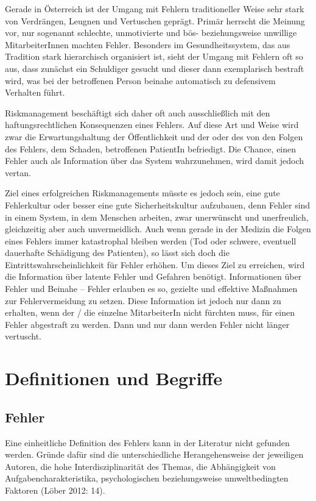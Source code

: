 Gerade in Österreich ist der Umgang mit Fehlern
traditioneller Weise sehr stark von Verdrängen, Leugnen und
Vertuschen geprägt. Primär herrscht die Meinung vor, nur
sogenannt schlechte, unmotivierte und bös- beziehungsweise
unwillige MitarbeiterInnen machten Fehler. Besonders im
Gesundheitssystem, das aus Tradition stark hierarchisch
organisiert ist, sieht der Umgang mit Fehlern oft so aus,
dass zunächst ein Schuldiger gesucht und dieser dann
exemplarisch bestraft wird, was bei der betroffenen Person
beinahe automatisch zu defensivem Verhalten führt.




Riskmanagement beschäftigt sich daher oft auch
ausschließlich mit den haftungsrechtlichen Konsequenzen
eines Fehlers. Auf diese Art und Weise wird zwar die
Erwartungshaltung der Öffentlichkeit und der oder des von
den Folgen des Fehlers, dem Schaden, betroffenen PatientIn
befriedigt. Die Chance, einen Fehler auch als Information
über das System wahrzunehmen, wird damit jedoch vertan.




Ziel eines erfolgreichen Riskmanagements müsste es jedoch
sein, eine gute Fehlerkultur oder besser eine gute
Sicherheitskultur aufzubauen, denn Fehler sind in einem
System, in dem Menschen arbeiten, zwar unerwünscht und
unerfreulich, gleichzeitig aber auch unvermeidlich. Auch
wenn gerade in der Medizin die Folgen eines Fehlers immer
katastrophal bleiben werden (Tod oder schwere, eventuell
dauerhafte Schädigung des Patienten), so lässt sich doch
die Eintrittswahrscheinlichkeit für Fehler erhöhen. Um
dieses Ziel zu erreichen, wird die Information über latente
Fehler und Gefahren benötigt. Informationen über Fehler und
Beinahe – Fehler erlauben es so, gezielte und effektive
Maßnahmen zur Fehlervermeidung zu setzen. Diese Information
ist jedoch nur dann zu erhalten, wenn der / die einzelne
MitarbeiterIn nicht fürchten muss, für einen Fehler
abgestraft zu werden. Dann und nur dann werden Fehler nicht
länger vertuscht.




\section{Definitionen und Begriffe}

\subsection{Fehler}

Eine einheitliche Definition des Fehlers kann in der
Literatur nicht gefunden werden. Gründe dafür sind die
unterschiedliche Herangehensweise der jeweiligen Autoren,
die hohe Interdisziplinarität des Themas, die Abhängigkeit
von Aufgabencharakteristika, psychologischen
beziehungsweise umweltbedingten Faktoren (Löber 2012: 14).




